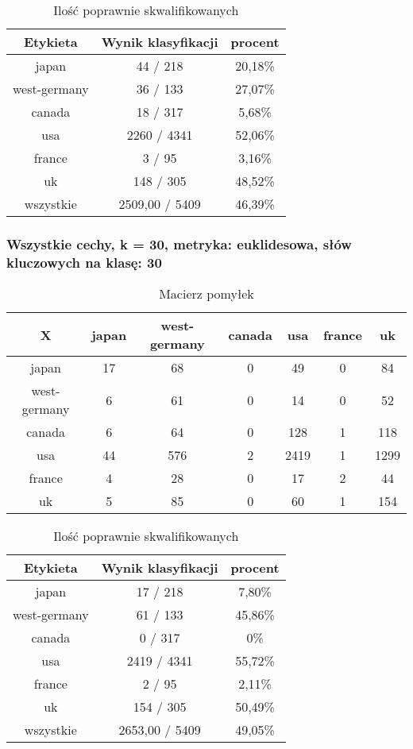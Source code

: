 \documentclass{classrep}
\begin{document}
\begin{table}[h]
\centering
\begin{tabular}{|c|c|c|}
\hline
Etykieta & Wynik klasyfikacji & procent\\
\hline
japan & 44 / 218 & 20,18\%\\
\hline
west-germany & 36 / 133 & 27,07\%\\
\hline
canada & 18 / 317 & 5,68\%\\
\hline
usa & 2260 / 4341 & 52,06\%\\
\hline
france & 3 / 95 & 3,16\%\\
\hline
uk & 148 / 305 & 48,52\%\\
\hline
wszystkie & 2509,00 / 5409 & 46,39\%\\
\hline
\end{tabular}
\caption{Ilość poprawnie skwalifikowanych}\end{table}



\newpage
\subsubsection{Wszystkie cechy, k = 30, metryka: euklidesowa, słów kluczowych na klasę: 30}
\begin{table}[h]
\centering
\begin{tabular}{|c|c|c|c|c|c|c|}
\hline
 X  & japan & west-germany & canada & usa & france & uk\\
\hline
japan & 17 & 68 & 0 & 49 & 0 & 84\\
\hline
west-germany & 6 & 61 & 0 & 14 & 0 & 52\\
\hline
canada & 6 & 64 & 0 & 128 & 1 & 118\\
\hline
usa & 44 & 576 & 2 & 2419 & 1 & 1299\\
\hline
france & 4 & 28 & 0 & 17 & 2 & 44\\
\hline
uk & 5 & 85 & 0 & 60 & 1 & 154\\
\hline
\end{tabular}
\caption{Macierz pomyłek}\end{table}

\begin{table}[h]
\centering
\begin{tabular}{|c|c|c|}
\hline
Etykieta & Wynik klasyfikacji & procent\\
\hline
japan & 17 / 218 & 7,80\%\\
\hline
west-germany & 61 / 133 & 45,86\%\\
\hline
canada & 0 / 317 & 0\%\\
\hline
usa & 2419 / 4341 & 55,72\%\\
\hline
france & 2 / 95 & 2,11\%\\
\hline
uk & 154 / 305 & 50,49\%\\
\hline
wszystkie & 2653,00 / 5409 & 49,05\%\\
\hline
\end{tabular}
\caption{Ilość poprawnie skwalifikowanych}\end{table}
\end{document}
